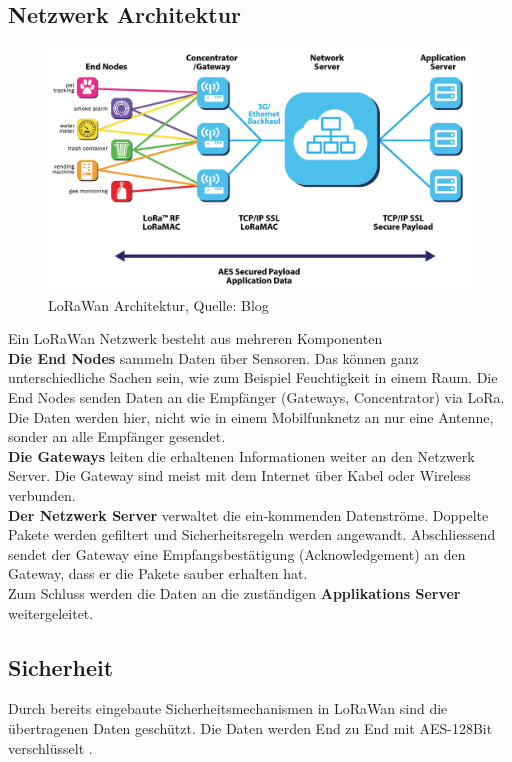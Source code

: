 \documentclass[11pt,english,german]{report}
\theoremstyle{definition}
\begin{document}
\subsection{Netzwerk Architektur}
\begin{figure}[H]
	\centering
	\includegraphics[width=\textwidth]{img/lora/lorawantopology.jpg}
	\caption[LoRaWan Architektur]
	{LoRaWan Architektur, Quelle: Blog \cite{lorawanarchitecture}}
\end{figure} 
Ein LoRaWan Netzwerk besteht aus mehreren Komponenten\\[0.3cm]
\textbf{Die End Nodes} sammeln Daten über Sensoren. Das können ganz unterschiedliche Sachen sein, wie zum Beispiel Feuchtigkeit in einem Raum. Die End Nodes senden Daten an die Empfänger (Gateways, Concentrator) via LoRa. Die Daten werden hier, nicht wie in einem Mobilfunknetz an nur eine Antenne, sonder an alle Empfänger gesendet.\\[0.3cm]
\textbf{Die Gateways} leiten die erhaltenen Informationen weiter an den Netzwerk Server. Die Gateway sind meist mit dem Internet über Kabel oder Wireless verbunden.\\[0.3cm]
\textbf{Der Netzwerk Server} verwaltet die ein-kommenden Datenströme. Doppelte Pakete werden gefiltert und Sicherheitsregeln werden angewandt. Abschliessend sendet der Gateway eine Empfangsbestätigung (Acknowledgement) an den Gateway, dass er die Pakete sauber erhalten hat.\\[0.3cm]
Zum Schluss werden die Daten an die zuständigen \textbf{Applikations Server} weitergeleitet.

\newpage
\subsection{Sicherheit}
Durch bereits eingebaute Sicherheitsmechanismen in LoRaWan sind die übertragenen Daten geschützt. Die Daten werden End zu End mit AES-128Bit verschlüsselt \cite{ttnsecuirty}.
\end{document}

